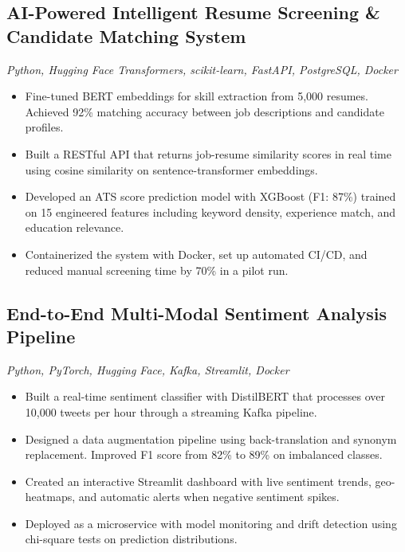 \documentclass[10pt]{article}
\begin{document}
\subsection{AI-Powered Intelligent Resume Screening \& Candidate Matching System}
\textit{Python, Hugging Face Transformers, scikit-learn, FastAPI, PostgreSQL, Docker}
\begin{itemize}
  \item Fine-tuned BERT embeddings for skill extraction from 5,000 resumes. Achieved 92\% matching accuracy between job descriptions and candidate profiles.
  \item Built a RESTful API that returns job-resume similarity scores in real time using cosine similarity on sentence-transformer embeddings.
  \item Developed an ATS score prediction model with XGBoost (F1: 87\%) trained on 15 engineered features including keyword density, experience match, and education relevance.
  \item Containerized the system with Docker, set up automated CI/CD, and reduced manual screening time by 70\% in a pilot run.
\end{itemize}

\subsection{End-to-End Multi-Modal Sentiment Analysis Pipeline}
\textit{Python, PyTorch, Hugging Face, Kafka, Streamlit, Docker}
\begin{itemize}
  \item Built a real-time sentiment classifier with DistilBERT that processes over 10,000 tweets per hour through a streaming Kafka pipeline.
  \item Designed a data augmentation pipeline using back-translation and synonym replacement. Improved F1 score from 82\% to 89\% on imbalanced classes.
  \item Created an interactive Streamlit dashboard with live sentiment trends, geo-heatmaps, and automatic alerts when negative sentiment spikes.
  \item Deployed as a microservice with model monitoring and drift detection using chi-square tests on prediction distributions.
\end{itemize}

\end{document}
